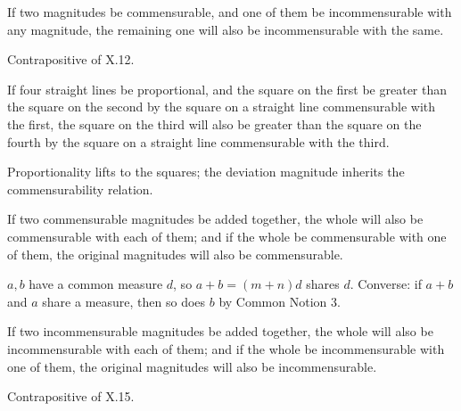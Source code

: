 \begin{claim}
\label{prop:X.13}
If two magnitudes be commensurable, and one of them be incommensurable
with any magnitude, the remaining one will also be incommensurable
with the same.
\end{claim}
\begin{evidence}[Proof of X.13]
\label{ev:X.13}
Contrapositive of X.12.
\end{evidence}

\begin{claim}
\label{prop:X.14}
If four straight lines be proportional, and the square on the first
be greater than the square on the second by the square on a straight
line commensurable with the first, the square on the third will also
be greater than the square on the fourth by the square on a straight
line commensurable with the third.
\end{claim}
\begin{evidence}[Proof of X.14]
\label{ev:X.14}
Proportionality lifts to the squares; the deviation magnitude
inherits the commensurability relation.
\end{evidence}

\begin{claim}
\label{prop:X.15}
If two commensurable magnitudes be added together, the whole will
also be commensurable with each of them; and if the whole be
commensurable with one of them, the original magnitudes will also be
commensurable.
\end{claim}
\begin{evidence}[Proof of X.15]
\label{ev:X.15}
$a, b$ have a common measure $d$, so $a + b = (m + n) d$ shares $d$.
Converse: if $a + b$ and $a$ share a measure, then so does $b$ by
Common Notion 3.
\end{evidence}

\begin{claim}
\label{prop:X.16}
If two incommensurable magnitudes be added together, the whole will
also be incommensurable with each of them; and if the whole be
incommensurable with one of them, the original magnitudes will also
be incommensurable.
\end{claim}
\begin{evidence}[Proof of X.16]
\label{ev:X.16}
Contrapositive of X.15.
\end{evidence}


